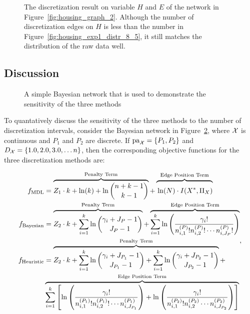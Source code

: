 \begin{figure}[ht]
\centering
      
  \caption{The discretization result on variable $H$ and $E$ of the network in Figure~\ref{fig:housing_graph_2}. Although the number of discretization edges on $H$ is less than the number in Figure~\ref{fig:housing_exp1_distr_8_5}, it still matches the distribution of the raw data well.}
  \label{fig:housing_exp2_distr_8_5}
\end{figure}

\subsection{Discussion}
\label{subsec:discuss_exp}

\begin{figure}[ht]
\centering
  
  \caption{A simple Bayesian network that is used to demonstrate the sensitivity of the three methods}
  \label{fig:exp_discuss}
\end{figure}

To quantatively discuss the sensitivity of the three methods to the number of discretization intervals, consider the Bayesian network in Figure~\ref{fig:exp_discuss}, where $\mathcal{X}$ is continuous and $P_1$ and $P_2$ are discrete.
If $\Pa_{\cX} = \curly{P_1, P_2}$ and $D_{\cX} = \curly{1.0,2.0,3.0, \ldots n}$, then the corresponding objective functions for the three discretization methods are:

\begin{small}
  \begin{equation}
  \begin{aligned}
  f_{\text{MDL}} & = \overbrace{Z_1 \cdot k + \ln(k) + \ln {{n +k - 1}\choose{k -1}} }^{\text{Penalty Term}}+   \overbrace{\rule{0pt}{1.35em} \ln(N) \cdot I(X^*, \Pi_X)}^{\text{Edge Position Term}} \\
  f_{\text{Bayesian}} &= \overbrace{\rule{0pt}{1.85em}  Z_2 \cdot k + \sum_{i=1}^k \ln {{\gamma_i + J_P - 1}\choose{J_P -1}}}^{\text{Penalty Term}} + \overbrace{\sum^k_{i=1} \ln \left(   {{\gamma_i !}\over{n^{(P)}_{i,1}! n^{(P)}_{i,2}! \cdots n^{(P)}_{i,J_P}!    }} \right) }^{\text{Edge Position Term}}\\
  f_{\text{Heuristic}} &= \overbrace{Z_2 \cdot k + \sum_{i=1}^k \ln {{\gamma_i + J_{P_1} - 1}\choose{J_{P_1} -1}} + \sum_{i=1}^k \ln {{\gamma_i + J_{P_2} - 1}\choose{J_{P_2} -1}} }^{\text{Penalty Term}}+\\
  & \overbrace{\sum^k_{i=1}  \left[ \ln \left(   {{\gamma_i !}\over{n^{(P_1)}_{i,1}! n^{(P_1)}_{i,2}! \cdots n^{(P_1)}_{i,J_{P_1}}    }} \right)  + \ln \left(   {{\gamma_i !}\over{n^{(P_2)}_{i,1}! n^{(P_2)}_{i,2} \cdots n^{(P_2)}_{i,J_{P_2}} }} \right) \right]}^{\text{Edge Position Term}}
  \end{aligned}\text{,}
  \end{equation}
\end{small}

